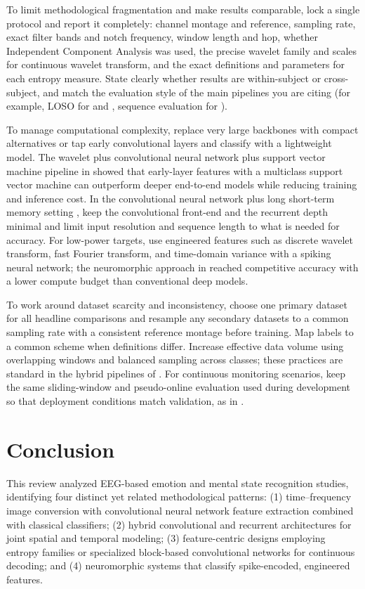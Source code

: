 \documentclass[conference]{IEEEtran}
\begin{document}
To limit methodological fragmentation and make results comparable, lock a single protocol and report it completely: channel montage and reference, sampling rate, exact filter bands and notch frequency, window length and hop, whether Independent Component Analysis was used, the precise wavelet family and scales for continuous wavelet transform, and the exact definitions and parameters for each entropy measure. State clearly whether results are within-subject or cross-subject, and match the evaluation style of the main pipelines you are citing (for example, LOSO for \cite{Bagherzadeh2023HybridEEGWaveletCNN_SVM} and \cite{Lee2020MFB_CNN_PilotMentalStates}, sequence evaluation for \cite{Chakravarthi2022EEGHybridCNNLSTM}).

To manage computational complexity, replace very large backbones with compact alternatives or tap early convolutional layers and classify with a lightweight model. The wavelet plus convolutional neural network plus support vector machine pipeline in \cite{Bagherzadeh2023HybridEEGWaveletCNN_SVM} showed that early-layer features with a multiclass support vector machine can outperform deeper end-to-end models while reducing training and inference cost. In the convolutional neural network plus long short-term memory setting \cite{Chakravarthi2022EEGHybridCNNLSTM}, keep the convolutional front-end and the recurrent depth minimal and limit input resolution and sequence length to what is needed for accuracy. For low-power targets, use engineered features such as discrete wavelet transform, fast Fourier transform, and time-domain variance with a spiking neural network; the neuromorphic approach in \cite{Luo2020SNN_EEGEmotion} reached competitive accuracy with a lower compute budget than conventional deep models.

To work around dataset scarcity and inconsistency, choose one primary dataset for all headline comparisons and resample any secondary datasets to a common sampling rate with a consistent reference montage before training. Map labels to a common scheme when definitions differ. Increase effective data volume using overlapping windows and balanced sampling across classes; these practices are standard in the hybrid pipelines of \cite{Bagherzadeh2023HybridEEGWaveletCNN_SVM,Chakravarthi2022EEGHybridCNNLSTM}. For continuous monitoring scenarios, keep the same sliding-window and pseudo-online evaluation used during development so that deployment conditions match validation, as in \cite{Lee2020MFB_CNN_PilotMentalStates}.


\section{Conclusion}
This review analyzed EEG-based emotion and mental state recognition studies, identifying four distinct yet related methodological patterns: (1) time–frequency image conversion with convolutional neural network feature extraction combined with classical classifiers; (2) hybrid convolutional and recurrent architectures for joint spatial and temporal modeling; (3) feature-centric designs employing entropy families or specialized block-based convolutional networks for continuous decoding; and (4) neuromorphic systems that classify spike-encoded, engineered features.
\end{document}
